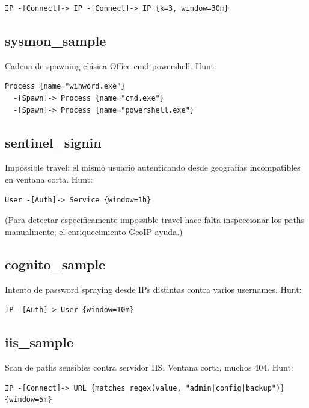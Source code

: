 \begin{lstlisting}[basicstyle=\ttfamily\small]
IP -[Connect]-> IP -[Connect]-> IP {k=3, window=30m}
\end{lstlisting}

\subsection{sysmon\_sample}

Cadena de spawning clásica Office \textrightarrow{}
cmd \textrightarrow{} powershell. Hunt:

\begin{lstlisting}[basicstyle=\ttfamily\small]
Process {name="winword.exe"}
  -[Spawn]-> Process {name="cmd.exe"}
  -[Spawn]-> Process {name="powershell.exe"}
\end{lstlisting}

\subsection{sentinel\_signin}

Impossible travel: el mismo usuario autenticando desde geografías
incompatibles en ventana corta. Hunt:

\begin{lstlisting}[basicstyle=\ttfamily\small]
User -[Auth]-> Service {window=1h}
\end{lstlisting}

(Para detectar específicamente impossible travel hace falta
inspeccionar los paths manualmente; el enriquecimiento GeoIP
ayuda.)

\subsection{cognito\_sample}

Intento de password spraying desde IPs distintas contra varios
usernames. Hunt:

\begin{lstlisting}[basicstyle=\ttfamily\small]
IP -[Auth]-> User {window=10m}
\end{lstlisting}

\subsection{iis\_sample}

Scan de paths sensibles contra servidor IIS. Ventana corta, muchos
404. Hunt:

\begin{lstlisting}[basicstyle=\ttfamily\small]
IP -[Connect]-> URL {matches_regex(value, "admin|config|backup")}
{window=5m}
\end{lstlisting}

